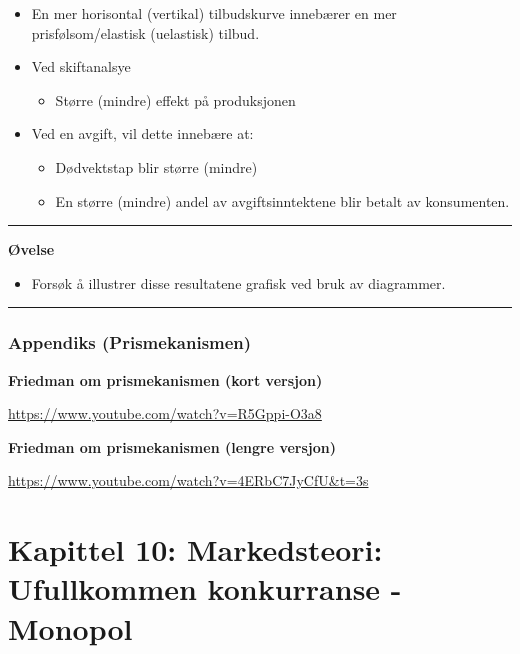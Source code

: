 \documentclass[
  letterpaper,
  DIV=11,
  numbers=noendperiod]{scrartcl}
\providecommand{\tightlist}{%
  \setlength{\itemsep}{0pt}\setlength{\parskip}{0pt}}\usepackage{longtable,booktabs,array}
\begin{document}
\begin{itemize}
\tightlist
\item
  En mer horisontal (vertikal) tilbudskurve innebærer en mer
  prisfølsom/elastisk (uelastisk) tilbud.
\item
  Ved skiftanalsye

  \begin{itemize}
  \tightlist
  \item
    Større (mindre) effekt på produksjonen
  \end{itemize}
\item
  Ved en avgift, vil dette innebære at:

  \begin{itemize}
  \tightlist
  \item
    Dødvektstap blir større (mindre)
  \item
    En større (mindre) andel av avgiftsinntektene blir betalt av
    konsumenten.
  \end{itemize}
\end{itemize}

\begin{center}\rule{0.5\linewidth}{0.5pt}\end{center}

\textbf{Øvelse}

\begin{itemize}
\tightlist
\item
  Forsøk å illustrer disse resultatene grafisk ved bruk av diagrammer.
\end{itemize}

\begin{center}\rule{0.5\linewidth}{0.5pt}\end{center}

\subsubsection{Appendiks
(Prismekanismen)}\label{appendiks-prismekanismen}

\textbf{Friedman om prismekanismen (kort versjon)}

\url{https://www.youtube.com/watch?v=R5Gppi-O3a8}

\textbf{Friedman om prismekanismen (lengre versjon)}

\url{https://www.youtube.com/watch?v=4ERbC7JyCfU&t=3s}

\section{Kapittel 10: Markedsteori: Ufullkommen konkurranse -
Monopol}\label{kapittel-10-markedsteori-ufullkommen-konkurranse---monopol}
\end{document}
